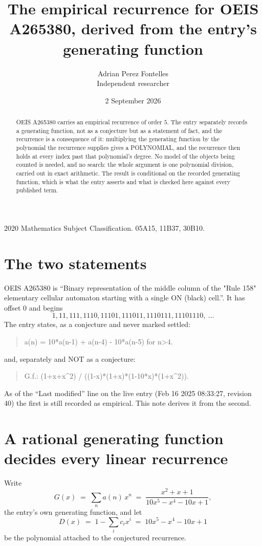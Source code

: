 \documentclass[11pt,a4paper]{article}
\title{The empirical recurrence for OEIS A265380, derived from the entry's generating function}
\author{Adrian Perez Fontelles\\ \small Independent researcher}
\date{2 September 2026}
\theoremstyle{plain}
\theoremstyle{definition}
\begin{document}
\maketitle

\begin{abstract}
OEIS A265380 carries an empirical recurrence of order $5$. The entry separately records a
generating function, not as a conjecture but as a statement of fact, and the recurrence is a
consequence of it: multiplying the generating function by the polynomial the recurrence
supplies gives a POLYNOMIAL, and the recurrence then holds at every index past that
polynomial's degree. No model of the objects being counted is needed, and no search: the
whole argument is one polynomial division, carried out in exact arithmetic. The result is
conditional on the recorded generating function, which is what the entry asserts and what is
checked here against every published term.
\end{abstract}

\noindent\small 2020 Mathematics Subject Classification. 05A15, 11B37, 30B10.\normalsize

\section{The two statements}

OEIS A265380 is ``Binary representation of the middle column of the "Rule 158" elementary cellular automaton starting with a single ON (black) cell.''. It has offset $0$ and begins
\[
1, 11, 111, 1110, 11101, 111011, 1110111, 11101110,\ \dots
\]
The entry states, as a conjecture and never marked settled:
\begin{quote}
a(n) = 10*a(n-1) + a(n-4) - 10*a(n-5) for n>4.
\end{quote}
and, separately and NOT as a conjecture:
\begin{quote}
G.f.: (1+x+x\^{}2) / ((1-x)*(1+x)*(1-10*x)*(1+x\^{}2)).
\end{quote}
As of the ``Last modified'' line on the live entry (Feb 16 2025 08:33:27, revision 40) the first is still
recorded as empirical. This note derives it from the second.

\section{A rational generating function decides every linear recurrence}

Write
\[
G(x)\;=\;\sum_{n}a(n)\,x^{n}\;=\;\frac{x^{2} + x + 1}{10 x^{5} - x^{4} - 10 x + 1},
\]
the entry's own generating function, and let
\[
D(x)\;=\;1-\sum_i c_i x^{i}\;=\;10 x^{5} - x^{4} - 10 x + 1
\]
be the polynomial attached to the conjectured recurrence.
\end{document}
